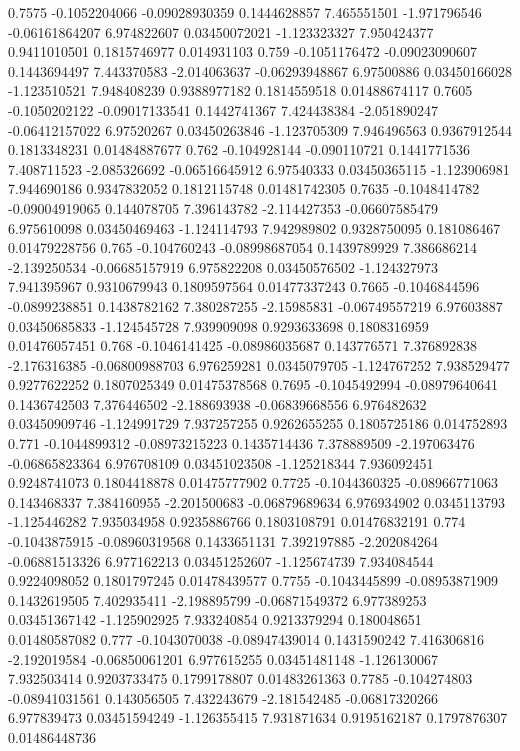 {0.7575 -0.1052204066 -0.09028930359 0.1444628857 7.465551501 -1.971796546 -0.06161864207 6.974822607 0.03450072021 -1.123323327 7.950424377 0.9411010501 0.1815746977 0.014931103
0.759 -0.1051176472 -0.09023090607 0.1443694497 7.443370583 -2.014063637 -0.06293948867 6.97500886 0.03450166028 -1.123510521 7.948408239 0.9388977182 0.1814559518 0.01488674117
0.7605 -0.1050202122 -0.09017133541 0.1442741367 7.424438384 -2.051890247 -0.06412157022 6.97520267 0.03450263846 -1.123705309 7.946496563 0.9367912544 0.1813348231 0.01484887677
0.762 -0.104928144 -0.090110721 0.1441771536 7.408711523 -2.085326692 -0.06516645912 6.97540333 0.03450365115 -1.123906981 7.944690186 0.9347832052 0.1812115748 0.01481742305
0.7635 -0.1048414782 -0.09004919065 0.144078705 7.396143782 -2.114427353 -0.06607585479 6.975610098 0.03450469463 -1.124114793 7.942989802 0.9328750095 0.181086467 0.01479228756
0.765 -0.104760243 -0.08998687054 0.1439789929 7.386686214 -2.139250534 -0.06685157919 6.975822208 0.03450576502 -1.124327973 7.941395967 0.9310679943 0.1809597564 0.01477337243
0.7665 -0.1046844596 -0.0899238851 0.1438782162 7.380287255 -2.15985831 -0.06749557219 6.97603887 0.03450685833 -1.124545728 7.939909098 0.9293633698 0.1808316959 0.01476057451
0.768 -0.1046141425 -0.08986035687 0.143776571 7.376892838 -2.176316385 -0.06800988703 6.976259281 0.0345079705 -1.124767252 7.938529477 0.9277622252 0.1807025349 0.01475378568
0.7695 -0.1045492994 -0.08979640641 0.1436742503 7.376446502 -2.188693938 -0.06839668556 6.976482632 0.03450909746 -1.124991729 7.937257255 0.9262655255 0.1805725186 0.014752893
0.771 -0.1044899312 -0.08973215223 0.1435714436 7.378889509 -2.197063476 -0.06865823364 6.976708109 0.03451023508 -1.125218344 7.936092451 0.9248741073 0.1804418878 0.01475777902
0.7725 -0.1044360325 -0.08966771063 0.143468337 7.384160955 -2.201500683 -0.06879689634 6.976934902 0.0345113793 -1.125446282 7.935034958 0.9235886766 0.1803108791 0.01476832191
0.774 -0.1043875915 -0.08960319568 0.1433651131 7.392197885 -2.202084264 -0.06881513326 6.977162213 0.03451252607 -1.125674739 7.934084544 0.9224098052 0.1801797245 0.01478439577
0.7755 -0.1043445899 -0.08953871909 0.1432619505 7.402935411 -2.198895799 -0.06871549372 6.977389253 0.03451367142 -1.125902925 7.933240854 0.9213379294 0.180048651 0.01480587082
0.777 -0.1043070038 -0.08947439014 0.1431590242 7.416306816 -2.192019584 -0.06850061201 6.977615255 0.03451481148 -1.126130067 7.932503414 0.9203733475 0.1799178807 0.01483261363
0.7785 -0.104274803 -0.08941031561 0.143056505 7.432243679 -2.181542485 -0.06817320266 6.977839473 0.03451594249 -1.126355415 7.931871634 0.9195162187 0.1797876307 0.01486448736
}
